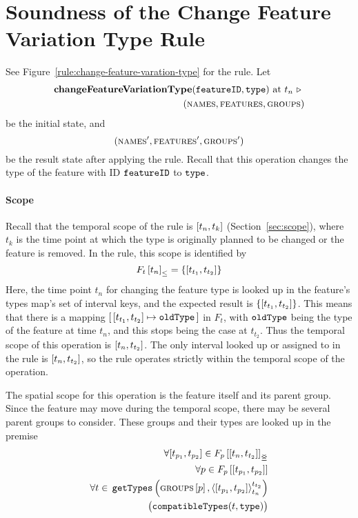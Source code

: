 
\section{Soundness of the Change Feature Variation Type Rule} 
\label{sec:soundness-of-the-change-feature-variation-type-rule}

See Figure~\vref{rule:change-feature-varation-type} for the  rule. Let 
\begin{equation*}
   \begin{split}
      \textbf{changeFeatureVariationType}(\texttt{featureID}, \texttt{type}) \text{ at } t_n \ \triangleright \  \\
      (\textsc{names}, \textsc{features}, \textsc{groups}{})
   \end{split}
\end{equation*}
be the initial state, and
\[
   (\textsc{names}', \textsc{features}', \textsc{groups}{}')
\]
be the result state after applying the  rule. Recall that this operation changes the type of the feature with ID $\texttt{featureID}$ to $\texttt{type}$.

\paragraph{Scope}
Recall that the temporal scope of the  rule is $\interval{t_n}{t_k}$ (Section~\vref{sec:scope}), where $t_k$ is the time point at which the type is originally planned to be changed or the feature is removed. In the rule, this scope is identified by 
   \[
      \containing{F_t}{t_n} = \set{\interval{t_{t_1}}{t_{t_2}}}
   \]
   Here, the time point $t_n$ for changing the feature type is looked up in the feature's types map's set of interval keys, and the expected result is $\set{\interval{t_{t_1}}{t_{t_2}}}$. This means that there is a mapping $\intervalmapping{t_{t_1}}{t_{t_2}}{\var{oldType}}$ in $F_t$, with $\texttt{oldType}$ being the type of the feature at time $t_n$, and this stops being the case at $t_{t_2}$. Thus the temporal scope of this operation is $\interval{t_n}{t_{t_2}}$. The only interval looked up or assigned to in the rule is $\interval{t_n}{t_{t_2}}$, so the rule operates strictly within the temporal scope of the operation.

   The spatial scope for this operation is the feature itself and its parent group. Since the feature may move during the temporal scope, there may be several parent groups to consider. These groups and their types are looked up in the premise
\[
   \begin{split}
      \forall \interval{t_{p_1}}{t_{p_2}} \in \overlapping{F_p}{t_n}{t_{t_2}}  \\ %
      \forall p \in \lookup{F_p}{\interval{t_{p_1}}{t_{p_2}}}  \\%
      \forall t \in \, \var{getTypes}\left(\lookup{\groups}{p}, \clamp{\interval{t_{p_1}}{t_{p_2}}}{t_n}{t_{t_2}}\right)  \\
          \big(\var{compatibleTypes}(t, \var{type})\big) 
    \end{split}
\]

